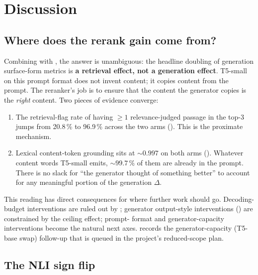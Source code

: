\documentclass[11pt,a4paper]{article}
\begin{document}
\clearpage\section{Discussion}
\label{sec:discussion}

\subsection{Where does the rerank gain come from?}
\label{sec:discussion-where}

Combining  with , the answer
is unambiguous: the headline doubling of generation surface-form metrics is
\textbf{a retrieval effect, not a generation effect}.  T5-small on
this prompt format does not invent content; it copies content from
the prompt.  The reranker's job is to ensure that the content the
generator copies is the \emph{right} content.  Two pieces of
evidence converge:

\begin{enumerate}
  \item The retrieval-flag rate of having $\geq\!1$
        relevance-judged passage in the top-3 jumps from 20.8\,\%
        to 96.9\,\% across the two arms ().
        This is the proximate mechanism.
  \item Lexical content-token grounding sits at $\sim\!0.997$ on
        both arms ().  Whatever content
        words T5-small emits, $\sim\!99.7\,\%$ of them are already
        in the prompt.  There is no slack for ``the generator
        thought of something better'' to account for any meaningful
        portion of the generation $\Delta$.
\end{enumerate}

This reading has direct consequences for where further work should
go.  Decoding-budget interventions are ruled out by
; generator output-style interventions
() are constrained by the ceiling effect; prompt-
format and generator-capacity interventions become the natural next
axes.   records the generator-capacity (T5-base swap)
follow-up that is queued in the project's reduced-scope plan.

\subsection{The NLI sign flip}
\label{sec:discussion-nli-flip}
\end{document}

